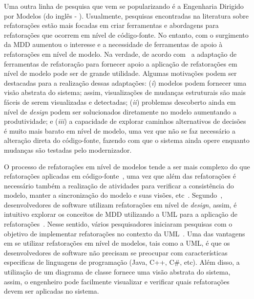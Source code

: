 Uma outra linha de pesquisa que vem se popularizando é a Engenharia Dirigido por Modelos (do inglês - ). Usualmente, pesquisas encontradas na literatura sobre refatorações estão mais focadas em criar ferramentas e abordagens para refatorações que ocorrem em nível de código-fonte. No entanto, com o surgimento da MDD aumentou o interesse e a necessidade de ferramentas de apoio à refatorações em nível de modelo. Na verdade, de acordo com~ a adaptação de ferramentas de refatoração para fornecer apoio a aplicação de refatorações em nível de modelo pode ser de grande utilidade. Algumas motivações podem ser destacadas para a realização dessas adaptações: (\emph{i}) modelos podem fornecer uma visão abstrata do sistema; assim, visualizações de mudanças estruturais são mais fáceis de serem visualizadas e detectadas; (\emph{ii}) problemas descoberto ainda em nível de \emph{design} podem ser solucionados diretamente no modelo aumentando a produtividade; e (\emph{iii}) a capacidade de explorar caminhos alternativos de decisões é muito mais barato em nível de modelo, uma vez que não se faz necessário a alteração direta do código-fonte, fazendo com que o sistema ainda opere enquanto mudanças são testadas pelo modernizador.


O processo de refatorações em nível de modelos tende a ser mais complexo do que refatorações aplicadas em código-fonte~\cite{Mens_2006}, uma vez que além das refatorações é necessário também a realização de atividades para verificar a consistência do modelo, manter a sincronização do modelo e suas visões, etc~\cite{KolahdouzRahimi20145}. Segundo~, desenvolvedores de software utilizam refatorações em nível de \emph{design}, assim, é intuitivo explorar os conceitos de MDD utilizando a UML para a aplicação de refatorações~\cite{Salem_2008, Gorp, Egyed_2008, Briand_2006, staron2004implementing}. Nesse sentido, vários pesquisadores iniciaram pesquisas com o objetivo de implementar refatorações no contexto da UML~\cite{revisao_sistematica_uml_refactoring}. Uma das vantagens em se utilizar refatorações em nível de modelos, tais como a UML, é que os desenvolvedores de software não precisam se preocupar com características especificas de linguagens de programação (Java, C++, C\#, etc). Além disso, a utilização de um diagrama de classe fornece uma visão abstrata do sistema, assim, o engenheiro pode facilmente visualizar e verificar quais refatorações devem ser aplicadas no sistema. 

